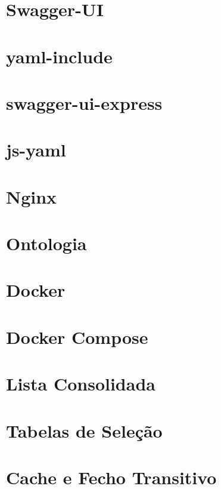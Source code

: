 \section{Swagger-UI}

\section{yaml-include}

\section{swagger-ui-express}

\section{js-yaml}

\section{Nginx}
\cite{nginxcook}

\section{Ontologia}
\cite{bontology}

\section{Docker}
\cite{udocker}

\section{Docker Compose}
\cite{udocker}

\section{Lista Consolidada}

\section{Tabelas de Seleção}

\section{Cache e Fecho Transitivo}
